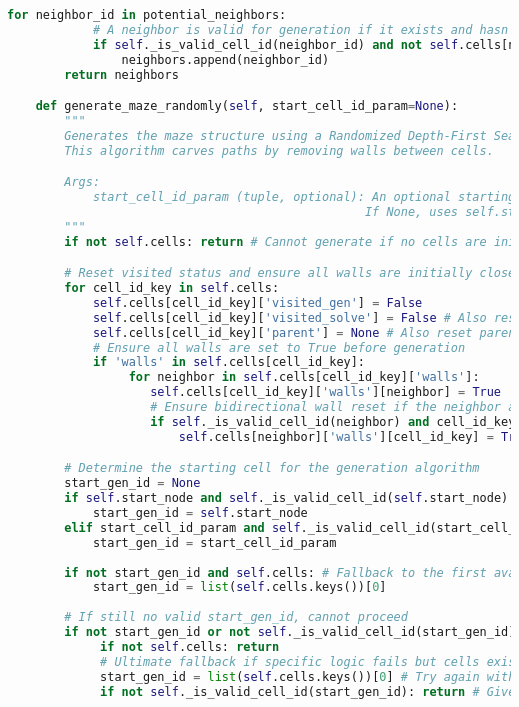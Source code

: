 \documentclass[UTF8]{report}
\theoremstyle{MyLineTheoremStyle} %
\theoremstyle{MyBlockTheoremStyle} %
\theoremstyle{MySubsubsectionStyle} %
\begin{document}
\begin{lstlisting}[language=Python, caption={迷宫生成与求解程序代码}]
        for neighbor_id in potential_neighbors:
            # A neighbor is valid for generation if it exists and hasn't been visited yet by the generation algorithm
            if self._is_valid_cell_id(neighbor_id) and not self.cells[neighbor_id]['visited_gen']:
                neighbors.append(neighbor_id)
        return neighbors

    def generate_maze_randomly(self, start_cell_id_param=None):
        """
        Generates the maze structure using a Randomized Depth-First Search (DFS) algorithm.
        This algorithm carves paths by removing walls between cells.

        Args:
            start_cell_id_param (tuple, optional): An optional starting cell for generation.
                                                  If None, uses self.start_node or a default.
        """
        if not self.cells: return # Cannot generate if no cells are initialized

        # Reset visited status and ensure all walls are initially closed (True)
        for cell_id_key in self.cells: 
            self.cells[cell_id_key]['visited_gen'] = False
            self.cells[cell_id_key]['visited_solve'] = False # Also reset solve state
            self.cells[cell_id_key]['parent'] = None # Also reset parent
            # Ensure all walls are set to True before generation
            if 'walls' in self.cells[cell_id_key]:
                 for neighbor in self.cells[cell_id_key]['walls']:
                    self.cells[cell_id_key]['walls'][neighbor] = True
                    # Ensure bidirectional wall reset if the neighbor also exists and has a wall entry
                    if self._is_valid_cell_id(neighbor) and cell_id_key in self.cells[neighbor]['walls']:
                        self.cells[neighbor]['walls'][cell_id_key] = True

        # Determine the starting cell for the generation algorithm
        start_gen_id = None
        if self.start_node and self._is_valid_cell_id(self.start_node): # Prefer the maze's defined start_node
            start_gen_id = self.start_node
        elif start_cell_id_param and self._is_valid_cell_id(start_cell_id_param): # Use parameter if provided and valid
            start_gen_id = start_cell_id_param
        
        if not start_gen_id and self.cells: # Fallback to the first available cell if no other start defined
            start_gen_id = list(self.cells.keys())[0]
        
        # If still no valid start_gen_id, cannot proceed
        if not start_gen_id or not self._is_valid_cell_id(start_gen_id):
             if not self.cells: return
             # Ultimate fallback if specific logic fails but cells exist
             start_gen_id = list(self.cells.keys())[0] # Try again with the first cell
             if not self._is_valid_cell_id(start_gen_id): return # Give up if still invalid



\end{lstlisting}
\end{document}
